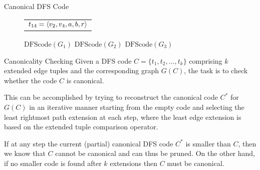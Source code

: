 \begin{frame}[fragile]{Canonical DFS Code}
\begin{figure}
{{{{{\begin{tabular}{c}
        $t_{14} = \langle v_2,v_4,a,b,r \rangle$\\
      \end{tabular}}
    \hspace{0.25in}
    \hspace{0.25in}
      }}
   }
  }
\end{figure}
  \vspace{-0.1in} 
\begin{figure}
    \normalsize
    \centerline{\hspace{0.35in}$\text{DFScode}(G_1)$
    \hspace{0.75in}$\text{DFScode}(G_2)$
    \hspace{0.65in}$\text{DFScode}(G_3)$}
\end{figure}
\end{frame}


\begin{frame}{Canonicality Checking}
Given a DFS code $C
= \{t_1, t_2, \ldots, t_k\}$ comprising $k$ extended edge tuples
and the corresponding graph $G(C)$, the task is to check whether
the code $C$ is canonical. 

\medskip
This can be accomplished by trying to
reconstruct the canonical code $C^*$ for $G(C)$ in an iterative
manner starting from the empty code and selecting the least
rightmost path extension at each step, where the least edge
extension is based on the extended tuple comparison operator.

\medskip
If at any step the current
(partial) canonical DFS code $C^*$ is smaller than $C$, then we
know that $C$ cannot be canonical and can thus be pruned. On the
other hand, if no smaller code is found after $k$ extensions then
$C$ must be canonical. 
\end{frame}



